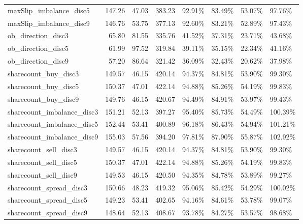 \begin{table}[ht]
{\begin{tabular}{lrrrllll}
maxSlip\_imbalance\_disc5      &    147.26 &   47.03 &  383.23 &   92.91\% &   83.49\% &   53.07\% &       97.76\% \\
maxSlip\_imbalance\_disc9      &    146.76 &   53.75 &  377.13 &   92.60\% &   83.21\% &   52.89\% &       97.43\% \\
ob\_direction\_disc3           &     65.80 &   81.55 &  335.76 &   41.52\% &   37.31\% &   23.71\% &       43.68\% \\
ob\_direction\_disc5           &     61.99 &   97.52 &  319.84 &   39.11\% &   35.15\% &   22.34\% &       41.16\% \\
ob\_direction\_disc9           &     57.20 &   86.64 &  321.42 &   36.09\% &   32.43\% &   20.62\% &       37.98\% \\
sharecount\_buy\_disc3         &    149.57 &   46.15 &  420.14 &   94.37\% &   84.81\% &   53.90\% &       99.30\% \\
sharecount\_buy\_disc5         &    150.37 &   47.01 &  422.14 &   94.88\% &   85.26\% &   54.19\% &       99.83\% \\
sharecount\_buy\_disc9         &    149.76 &   46.15 &  420.67 &   94.49\% &   84.91\% &   53.97\% &       99.43\% \\
sharecount\_imbalance\_disc3   &    151.21 &   52.13 &  397.27 &   95.40\% &   85.73\% &   54.49\% &      100.39\% \\
sharecount\_imbalance\_disc5   &    152.44 &   53.41 &  400.89 &   96.18\% &   86.43\% &   54.94\% &      101.21\% \\
sharecount\_imbalance\_disc9   &    155.03 &   57.56 &  394.20 &   97.81\% &   87.90\% &   55.87\% &      102.92\% \\
sharecount\_sell\_disc3        &    149.57 &   46.15 &  420.14 &   94.37\% &   84.81\% &   53.90\% &       99.30\% \\
sharecount\_sell\_disc5        &    150.37 &   47.01 &  422.14 &   94.88\% &   85.26\% &   54.19\% &       99.83\% \\
sharecount\_sell\_disc9        &    149.53 &   46.15 &  420.50 &   94.35\% &   84.78\% &   53.89\% &       99.27\% \\
sharecount\_spread\_disc3      &    150.66 &   48.23 &  419.32 &   95.06\% &   85.42\% &   54.29\% &      100.02\% \\
sharecount\_spread\_disc5      &    149.23 &   53.41 &  402.65 &   94.16\% &   84.61\% &   53.78\% &       99.07\% \\
sharecount\_spread\_disc9      &    148.64 &   52.13 &  408.67 &   93.78\% &   84.27\% &   53.57\% &       98.68\% \\

\end{tabular}}
\end{table}
